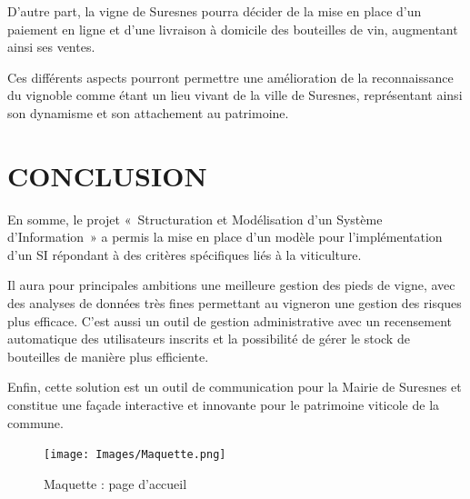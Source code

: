 \documentclass[a4paper, title]{report}
\begin{document}
D'autre part, la vigne de Suresnes pourra décider de la mise en place
d'un paiement en ligne et d'une livraison à domicile des bouteilles de
vin, augmentant ainsi ses ventes.

Ces différents aspects pourront permettre une amélioration de la
reconnaissance du vignoble comme étant un lieu vivant de la ville de
Suresnes, représentant ainsi son dynamisme et son attachement au
patrimoine.

\newpage
\chapter{CONCLUSION}\label{conclusion}

En somme, le projet «~Structuration et Modélisation d'un Système
d'Information~» a permis la mise en place d'un modèle pour
l'implémentation d'un SI répondant à des critères spécifiques liés à la
viticulture.

Il aura pour principales ambitions une meilleure gestion des pieds de
vigne, avec des analyses de données très fines permettant au vigneron
une gestion des risques plus efficace. C'est aussi un outil de gestion
administrative avec un recensement automatique des utilisateurs inscrits
et la possibilité de gérer le stock de bouteilles de manière plus
efficiente.

Enfin, cette solution est un outil de communication pour la Mairie de
Suresnes et constitue une façade interactive et innovante pour le
patrimoine viticole de la commune.

\begin{figure}
\centering
\texttt{[image: Images/Maquette.png]}
\caption{Maquette : page d'accueil}
\end{figure}
\end{document}
